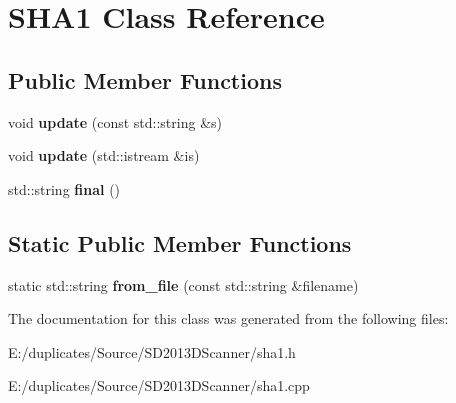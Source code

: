 \hypertarget{class_s_h_a1}{\section{S\-H\-A1 Class Reference}
\label{class_s_h_a1}
}
\subsection*{Public Member Functions}
\begin{DoxyCompactItemize}
\item 
\hypertarget{class_s_h_a1_aec3a46058baf8b4169389c89e3a0a2f4}{void {\bfseries update} (const std\-::string \&s)}\label{class_s_h_a1_aec3a46058baf8b4169389c89e3a0a2f4}

\item 
\hypertarget{class_s_h_a1_a71d172f1d0b34c5a381ccdfce5aa6ab5}{void {\bfseries update} (std\-::istream \&is)}\label{class_s_h_a1_a71d172f1d0b34c5a381ccdfce5aa6ab5}

\item 
\hypertarget{class_s_h_a1_a89ba0f16575431b0942cbbcfb29107db}{std\-::string {\bfseries final} ()}\label{class_s_h_a1_a89ba0f16575431b0942cbbcfb29107db}

\end{DoxyCompactItemize}
\subsection*{Static Public Member Functions}
\begin{DoxyCompactItemize}
\item 
\hypertarget{class_s_h_a1_a1bec6fb50bcfb5e3f6fb5c8f258a1f41}{static std\-::string {\bfseries from\-\_\-file} (const std\-::string \&filename)}\label{class_s_h_a1_a1bec6fb50bcfb5e3f6fb5c8f258a1f41}

\end{DoxyCompactItemize}


The documentation for this class was generated from the following files\-:\begin{DoxyCompactItemize}
\item 
E\-:/duplicates/\-Source/\-S\-D2013\-D\-Scanner/sha1.\-h\item 
E\-:/duplicates/\-Source/\-S\-D2013\-D\-Scanner/sha1.\-cpp\end{DoxyCompactItemize}
